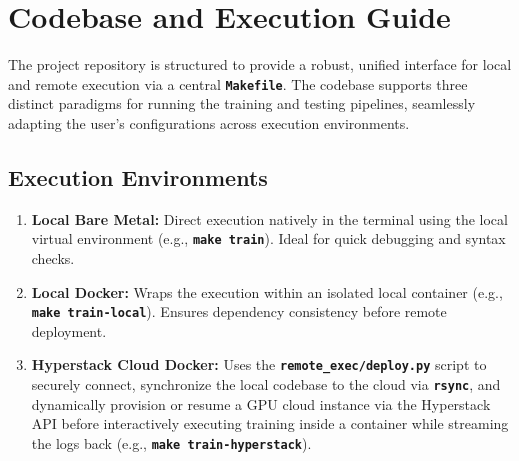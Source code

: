 
\clearpage
\section{Codebase and Execution Guide}
\label{sec:usage}

The project repository is structured to provide a robust, unified interface for local and remote execution via a central \textbf{\texttt{Makefile}}. The codebase supports three distinct paradigms for running the training and testing pipelines, seamlessly adapting the user's configurations across execution environments.

\subsection{Execution Environments}
\begin{enumerate}
    \item \textbf{Local Bare Metal:} Direct execution natively in the terminal using the local virtual environment (e.g., \textbf{\texttt{make train}}). Ideal for quick debugging and syntax checks.
    \item \textbf{Local Docker:} Wraps the execution within an isolated local container (e.g., \textbf{\texttt{make train-local}}). Ensures dependency consistency before remote deployment.
    \item \textbf{Hyperstack Cloud Docker:} Uses the \textbf{\texttt{remote\_exec/deploy.py}} script to securely connect, synchronize the local codebase to the cloud via \textbf{\texttt{rsync}}, and dynamically provision or resume a GPU cloud instance via the Hyperstack API before interactively executing training inside a container while streaming the logs back (e.g., \textbf{\texttt{make train-hyperstack}}).
\end{enumerate}

